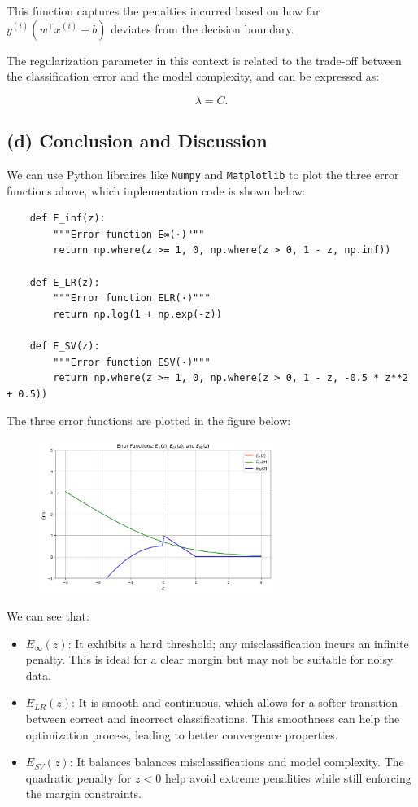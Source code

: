 \documentclass[12pt]{article}
\begin{document}
This function captures the penalties incurred based on how far \(y^{(i)}(w^\top x^{(i)} + b)\) deviates from the decision boundary.

The regularization parameter in this context is related to the trade-off between the classification error and the model complexity, and can be expressed as:

\[
\lambda = C.
\]

\subsection*{(d) Conclusion and Discussion}

We can use Python libraires like \texttt{Numpy} and \texttt{Matplotlib} to plot the three error functions above, which inplementation code is shown below:

\begin{verbatim}
    def E_inf(z):
        """Error function E∞(·)"""
        return np.where(z >= 1, 0, np.where(z > 0, 1 - z, np.inf))

    def E_LR(z):
        """Error function ELR(·)"""
        return np.log(1 + np.exp(-z))

    def E_SV(z):
        """Error function ESV(·)"""
        return np.where(z >= 1, 0, np.where(z > 0, 1 - z, -0.5 * z**2 + 0.5))

\end{verbatim}

The three error functions are plotted in the figure below:

\begin{figure}[H]
    \centering
    \includegraphics[width=0.68\textwidth]{2_1_d_output.png}  
    \label{fig:Three erroe functions}
\end{figure}

We can see that:
\begin{itemize}
    \item \(E_\infty(z)\): It exhibits a hard threshold; any misclassification incurs an infinite penalty. This is ideal for a clear margin but may not be suitable for noisy data.
    \item \(E_{LR}(z)\): It is smooth and continuous, which allows for a softer transition between correct and incorrect classifications. This smoothness can help the optimization process, leading to better convergence properties.
    \item \(E_{SV}(z)\): It balances balances misclassifications and model complexity. The quadratic penalty for \(z < 0\) help avoid extreme penalities while still enforcing the margin constraints.
\end{itemize}
\end{document}
